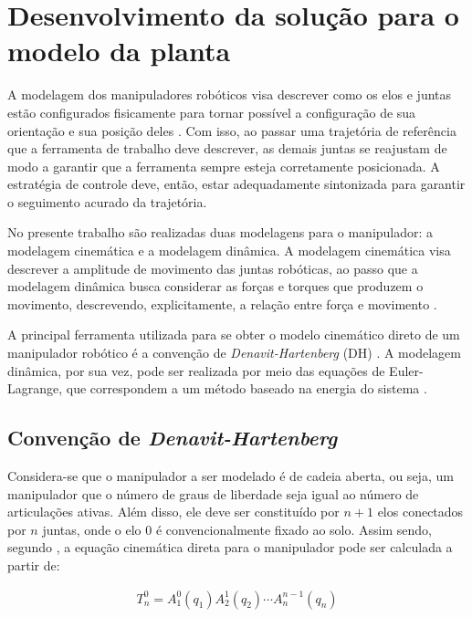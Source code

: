 \section{Desenvolvimento da solução para o modelo da planta}
\label{metodo}

A modelagem dos manipuladores robóticos visa descrever como os elos e juntas estão 
configurados fisicamente para tornar possível a configuração de sua orientação e sua posição 
deles \cite{paul1981robot}. Com isso, ao passar uma trajetória de referência que a 
ferramenta de trabalho deve descrever, as demais juntas se reajustam de modo a garantir 
que a ferramenta sempre esteja corretamente posicionada. A estratégia de controle deve, 
então, estar adequadamente sintonizada para garantir o seguimento acurado da trajetória.

No presente trabalho são realizadas duas modelagens para o manipulador: a modelagem 
cinemática e a modelagem dinâmica. A modelagem cinemática visa descrever a amplitude 
de movimento das juntas robóticas, ao passo que a modelagem dinâmica busca considerar 
as forças e torques que produzem o movimento, descrevendo, explicitamente, a relação 
entre força e movimento \cite{Spong}.

A principal ferramenta utilizada para se obter o modelo cinemático direto de um 
manipulador robótico é a convenção de \textit{Denavit-Hartenberg} (DH) \cite{paul1981robot}
. A modelagem dinâmica, por sua vez, pode ser realizada por meio das equações de 
Euler-Lagrange, que correspondem a um método baseado na energia do sistema 
\cite{Park}.

\subsection{Convenção de \textit{Denavit-Hartenberg}}
\label{DH}

Considera-se que o manipulador a ser modelado é de cadeia aberta, ou seja, um manipulador 
que o número de graus de liberdade seja igual ao número de articulações ativas.
Além disso, ele deve ser constituído por $n+1$ elos conectados por $n$ juntas, onde 
o elo $0$ é convencionalmente fixado ao solo. Assim sendo, segundo , 
a equação cinemática direta para o manipulador pode ser calculada a partir de:

\begin{equation}
  \begin{gathered}
    T^0_n = A^0_1(q_1)A^1_2(q_2)\cdots A^{n-1}_n(q_n)
  \end{gathered}
  \label{eq:cinematicaDireta}
\end{equation}

